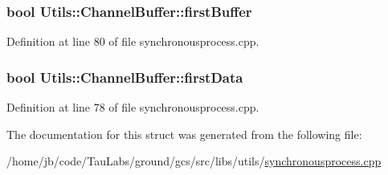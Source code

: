 \hypertarget{struct_utils_1_1_channel_buffer_ac695882231416a6a43841faf53242fbc}{
\subsubsection[{first\-Buffer}]{\setlength{\rightskip}{0pt plus 5cm}bool {\bf \-Utils\-::\-Channel\-Buffer\-::first\-Buffer}}}\label{struct_utils_1_1_channel_buffer_ac695882231416a6a43841faf53242fbc}


\-Definition at line 80 of file synchronousprocess.\-cpp.

\hypertarget{struct_utils_1_1_channel_buffer_acb0128e17057f24d11abcb41acfd2da4}{
\subsubsection[{first\-Data}]{\setlength{\rightskip}{0pt plus 5cm}bool {\bf \-Utils\-::\-Channel\-Buffer\-::first\-Data}}}\label{struct_utils_1_1_channel_buffer_acb0128e17057f24d11abcb41acfd2da4}


\-Definition at line 78 of file synchronousprocess.\-cpp.



\-The documentation for this struct was generated from the following file\-:\begin{DoxyCompactItemize}
\item 
/home/jb/code/\-Tau\-Labs/ground/gcs/src/libs/utils/\hyperlink{synchronousprocess_8cpp}{synchronousprocess.\-cpp}\end{DoxyCompactItemize}
